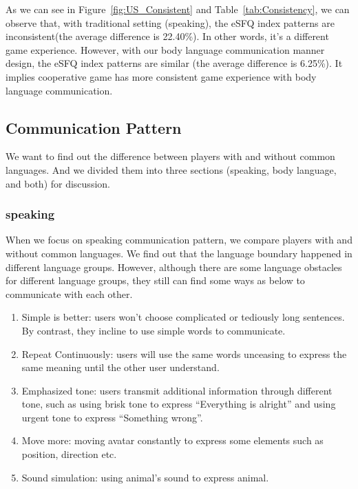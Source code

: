 As we can see in Figure~\ref{fig:US_Consistent} and Table~\ref{tab:Consistency}, we can observe that, with traditional setting (speaking), the eSFQ index patterns are inconsistent(the average difference is 22.40\%). In other words, it's a different game experience. However, with our body language communication manner design, the eSFQ 
index patterns are similar (the average difference is 6.25\%). It implies cooperative game has more consistent game experience with body language communication.




\subsection{Communication Pattern}
We want to find out the difference between players with and without common languages. And we divided them into three sections (speaking, body language, and both) for discussion.

\subsubsection{speaking}
When we focus on speaking communication pattern, we compare players with and without common languages. We find out that the language boundary happened in different language groups. However, although there are some language obstacles for different language groups, they still can find some ways as below to communicate with each other.

\begin{enumerate}
  \item Simple is better: users won't choose complicated or tediously long sentences. By contrast, they incline to use simple words to communicate. 

  \item Repeat Continuously: users will use the same words unceasing to express the same meaning until the other user understand.
  
  \item Emphasized tone: users transmit additional information through different tone, such as using brisk tone to express ``Everything is alright'' and using urgent tone to express ``Something wrong''.
  
  \item Move more: moving avatar constantly to express some elements such as position, direction etc.
  
  \item Sound simulation: using animal's sound to express animal.
\end{enumerate}


